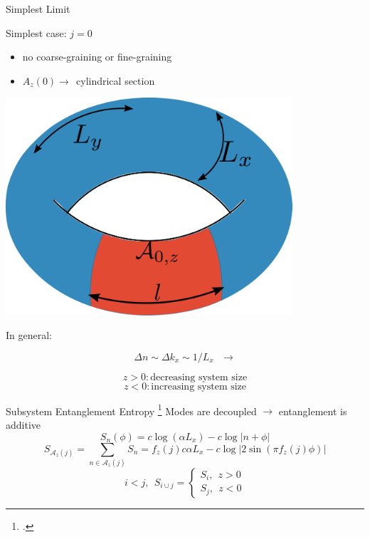 \documentclass[12pt,aspectratio=169]{beamer}
\begin{document}
\begin{frame}{Simplest Limit}
\hspace*{\fill}
\begin{minipage}{0.5\textwidth}
Simplest case: \(j=0\)\\[5pt]
\begin{itemize}
	\item no coarse-graining or fine-graining\\[20pt]
	\item \(A_z(0) \longrightarrow ~ ~\)\alert{cylindrical section}
\end{itemize}
\end{minipage}
\hspace*{\fill}
\begin{minipage}{0.4\textwidth}
	\includegraphics[width=0.8\textwidth]{figures/A_m1.pdf}
\end{minipage}

\vspace*{\fill}
\centering
In general:

\begin{minipage}{0.33\textwidth}
	\[\Delta n \sim \Delta k_x \sim 1/L_x ~ ~ ~\longrightarrow \]
\end{minipage}
\begin{minipage}{0.33\textwidth}
	\[ z > 0: \text{decreasing system size}\]
	\[ z < 0: \text{increasing system size}\]
\end{minipage}
\end{frame}

\begin{frame}{Subsystem Entanglement Entropy}
\footcite{Calabrese_2004,Casini_2005,Arias_2015,Chen_2017,Murciano_2020}
Modes are decoupled \(\longrightarrow\) entanglement is additive
\vspace*{\fill}
\[S_n(\phi) = c \log \left(\alpha L_x\right) - c \log |n + \phi|\]
\[S_{\mathcal{A}_z(j)} = \sum_{n \in \mathcal{A}_z(j)} S_n = f_z(j) c \alpha L_x - c \log \big|2\sin\left(\pi f_z(j)\phi\right)\big|\]
\[i < j, ~ ~ S_{i\cup j} =
	\begin{cases}
	S_{i}, ~ ~ z > 0\\
	S_{j}, ~ ~ z < 0
	\end{cases}
\]
\end{frame}
\end{document}
